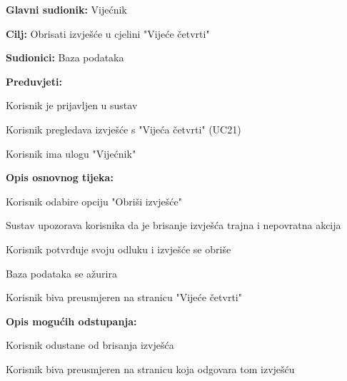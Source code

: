 					\noindent {}
					\begin{packed_item}
	
						\item \textbf{Glavni sudionik: }Vijećnik
						\item  \textbf{Cilj:} Obrisati izvješće u cjelini "Vijeće četvrti"
						\item  \textbf{Sudionici:} Baza podataka
						\item  \textbf{Preduvjeti:}
						\item[] \begin{packed_enum}
							\item Korisnik je prijavljen u sustav
							\item Korisnik pregledava izvješće s "Vijeća četvrti" (UC21)
							\item Korisnik ima ulogu "Vijećnik"														\end{packed_enum}
						\item  \textbf{Opis osnovnog tijeka:}
						
						\item[] \begin{packed_enum}
	
							\item Korisnik odabire opciju "Obriši izvješće"
							\item Sustav upozorava korisnika da je brisanje izvješća trajna i nepovratna akcija
							\item Korisnik potvrđuje svoju odluku i izvješće se obriše
							\item Baza podataka se ažurira
							\item Korisnik biva preusmjeren na stranicu "Vijeće četvrti"
						\end{packed_enum}
						
						\item  \textbf{Opis mogućih odstupanja:}
						
						\item[] \begin{packed_item}
	
							\item[3.a] Korisnik odustane od brisanja izvješća
							\item[] \begin{packed_enum}
								
								\item Korisnik biva preusmjeren na stranicu koja odgovara tom izvješću
								
							\end{packed_enum}
							
						\end{packed_item}
					\end{packed_item}
						
